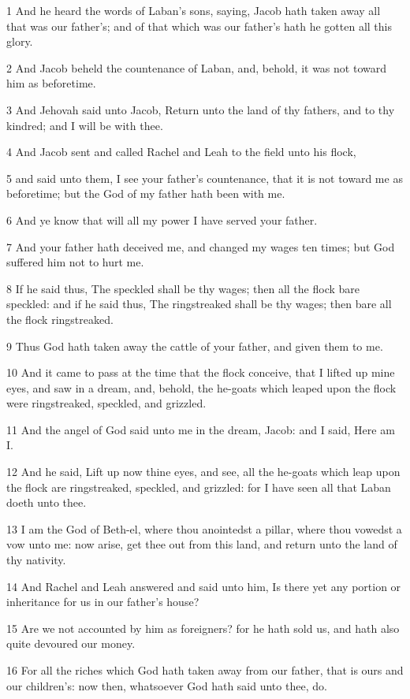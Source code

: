 \par 1 And he heard the words of Laban's sons, saying, Jacob hath taken away all that was our father's; and of that which was our father's hath he gotten all this glory.
\par 2 And Jacob beheld the countenance of Laban, and, behold, it was not toward him as beforetime.
\par 3 And Jehovah said unto Jacob, Return unto the land of thy fathers, and to thy kindred; and I will be with thee.
\par 4 And Jacob sent and called Rachel and Leah to the field unto his flock,
\par 5 and said unto them, I see your father's countenance, that it is not toward me as beforetime; but the God of my father hath been with me.
\par 6 And ye know that will all my power I have served your father.
\par 7 And your father hath deceived me, and changed my wages ten times; but God suffered him not to hurt me.
\par 8 If he said thus, The speckled shall be thy wages; then all the flock bare speckled: and if he said thus, The ringstreaked shall be thy wages; then bare all the flock ringstreaked.
\par 9 Thus God hath taken away the cattle of your father, and given them to me.
\par 10 And it came to pass at the time that the flock conceive, that I lifted up mine eyes, and saw in a dream, and, behold, the he-goats which leaped upon the flock were ringstreaked, speckled, and grizzled.
\par 11 And the angel of God said unto me in the dream, Jacob: and I said, Here am I.
\par 12 And he said, Lift up now thine eyes, and see, all the he-goats which leap upon the flock are ringstreaked, speckled, and grizzled: for I have seen all that Laban doeth unto thee.
\par 13 I am the God of Beth-el, where thou anointedst a pillar, where thou vowedst a vow unto me: now arise, get thee out from this land, and return unto the land of thy nativity.
\par 14 And Rachel and Leah answered and said unto him, Is there yet any portion or inheritance for us in our father's house?
\par 15 Are we not accounted by him as foreigners? for he hath sold us, and hath also quite devoured our money.
\par 16 For all the riches which God hath taken away from our father, that is ours and our children's: now then, whatsoever God hath said unto thee, do.
